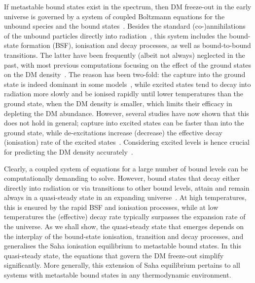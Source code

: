 \documentclass[preprint,5p,twocolumn]{elsarticle}
\begin{document}
If metastable bound states exist in the spectrum, then DM freeze-out in the early universe is governed by a system of coupled Boltzmann equations for the unbound species and the bound states~\cite{vonHarling:2014kha}. Besides the standard (co-)annihilations of the unbound particles directly into radiation~\cite{Griest:1990kh,Gondolo:1990dk}, this system  includes the bound-state formation (BSF), ionisation and decay processes, as well as bound-to-bound transitions. The latter have been frequently (albeit not always) neglected in the past, with most previous computations focusing on the effect of the ground states on the DM density~\cite{vonHarling:2014kha,Ellis:2015vaa,Baldes:2017gzw,Harz:2018csl,Harz:2019rro}. The reason has been two-fold: the capture into the ground state is indeed dominant in some models~\cite{Petraki:2015hla,Petraki:2016cnz,Oncala:2018bvl}, while excited states tend to decay into radiation more slowly and be ionised rapidly until lower temperatures than the ground state, when the DM density is smaller, which limits their efficacy in depleting the DM abundance. However, several studies have now shown that this does not hold in general; capture into excited states can be faster than into the ground state, while de-excitations increase (decrease) the effective decay (ionisation) rate of the excited states~\cite{Oncala:2019yvj,Oncala:2021tkz,Oncala:2021swy,Bottaro:2021snn}. Considering excited levels is hence crucial for predicting the DM density accurately~\cite{Oncala:2021swy,Bottaro:2021snn}. 

Clearly, a coupled system of equations for a large number of bound levels can be computationally demanding to solve. However, bound states that decay either directly into radiation or via transitions to other bound levels, attain and remain always in a quasi-steady state in an expanding universe~\cite{Ellis:2015vaa}. At high temperatures, this is ensured by the rapid BSF and ionisation processes, while at low temperatures the (effective) decay rate typically surpasses the expansion rate of the universe. As we shall show, the quasi-steady state that emerges depends on the interplay of the bound-state ionisation, transition and decay processes, and generalises the Saha ionisation equilibrium to metastable bound states. In this quasi-steady state, the equations that govern the DM freeze-out simplify significantly. More generally, this extension of Saha equilibrium pertains to all systems with metastable bound states in any thermodynamic environment. 
\end{document}
